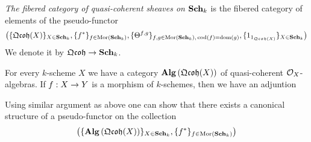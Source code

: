 \begin{definition}
\textit{The fibered category of quasi-coherent sheaves on $\mathbf{Sch}_k$} is the fibered category of elements of the pseudo-functor
$$\big(\{\mathfrak{Qcoh}(X)\}_{X\in \mathbf{Sch}_k},\{f^*\}_{f\in \mathrm{Mor}(\mathbf{Sch}_k)},\{\Theta^{f,g}\}_{f,g\in \mathrm{Mor}(\mathbf{Sch}_k),\,\mathrm{cod}(f)=\mathrm{dom}(g)},\{1_{1_{\mathfrak{Qcoh}(X)}}\}_{X\in \mathbf{Sch}_k}\big)$$
We denote it by $\mathfrak{Qcoh} \rightarrow \mathbf{Sch}_k$.
\end{definition}
\noindent
For every $k$-scheme $X$ we have a category $\mathbf{Alg}\left(\mathfrak{Qcoh}(X)\right)$ of quasi-coherent ${\mathcal O}_X$-algebras. If $f:X\rightarrow Y$ is a morphism of $k$-schemes, then we have an adjuntion
\begin{center}   
\end{center}
Using similar argument as above one can show that there exists a canonical structure of a pseudo-functor on the collection
$$\big(\{\mathbf{Alg}\left(\mathfrak{Qcoh}(X)\right)\}_{X\in \mathbf{Sch}_k},\{f^*\}_{f\in \mathrm{Mor}(\mathbf{Sch}_k)}\big)$$

